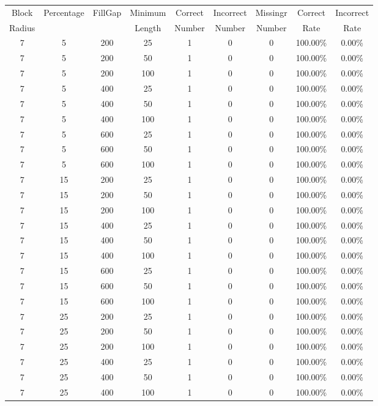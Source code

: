 \clearpage
\begingroup
\setlength{\LTleft}{-20cm plus -1fill}
\setlength{\LTright}{\LTleft}
{\small
\begin{longtable}{| c | c | c | c | c | c | c | c | c |} \hline
Block & Percentage & FillGap & Minimum & Correct & Incorrect & Missingr & Correct & Incorrect \\
Radius &  & & Length & Number & Number & Number & Rate & Rate \\ \hline
7 & 5 & 200 & 25 & 1 & 0 & 0 & 100.00\% & 0.00\% \\
7 & 5 & 200 & 50 & 1 & 0 & 0 & 100.00\% & 0.00\% \\
7 & 5 & 200 & 100 & 1 & 0 & 0 & 100.00\% & 0.00\% \\
7 & 5 & 400 & 25 & 1 & 0 & 0 & 100.00\% & 0.00\% \\
7 & 5 & 400 & 50 & 1 & 0 & 0 & 100.00\% & 0.00\% \\
7 & 5 & 400 & 100 & 1 & 0 & 0 & 100.00\% & 0.00\% \\
7 & 5 & 600 & 25 & 1 & 0 & 0 & 100.00\% & 0.00\% \\
7 & 5 & 600 & 50 & 1 & 0 & 0 & 100.00\% & 0.00\% \\
7 & 5 & 600 & 100 & 1 & 0 & 0 & 100.00\% & 0.00\% \\
7 & 15 & 200 & 25 & 1 & 0 & 0 & 100.00\% & 0.00\% \\
7 & 15 & 200 & 50 & 1 & 0 & 0 & 100.00\% & 0.00\% \\
7 & 15 & 200 & 100 & 1 & 0 & 0 & 100.00\% & 0.00\% \\
7 & 15 & 400 & 25 & 1 & 0 & 0 & 100.00\% & 0.00\% \\
7 & 15 & 400 & 50 & 1 & 0 & 0 & 100.00\% & 0.00\% \\
7 & 15 & 400 & 100 & 1 & 0 & 0 & 100.00\% & 0.00\% \\
7 & 15 & 600 & 25 & 1 & 0 & 0 & 100.00\% & 0.00\% \\
7 & 15 & 600 & 50 & 1 & 0 & 0 & 100.00\% & 0.00\% \\
7 & 15 & 600 & 100 & 1 & 0 & 0 & 100.00\% & 0.00\% \\
7 & 25 & 200 & 25 & 1 & 0 & 0 & 100.00\% & 0.00\% \\
7 & 25 & 200 & 50 & 1 & 0 & 0 & 100.00\% & 0.00\% \\
7 & 25 & 200 & 100 & 1 & 0 & 0 & 100.00\% & 0.00\% \\
7 & 25 & 400 & 25 & 1 & 0 & 0 & 100.00\% & 0.00\% \\
7 & 25 & 400 & 50 & 1 & 0 & 0 & 100.00\% & 0.00\% \\
7 & 25 & 400 & 100 & 1 & 0 & 0 & 100.00\% & 0.00\% \\

\end{longtable}}
